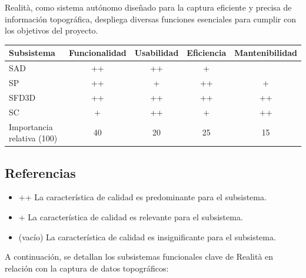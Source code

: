 \documentclass[12pt,a4paper, twoside]{article} %
\begin{document}
Realità, como sistema autónomo diseñado para la captura eficiente y precisa de información topográfica, despliega diversas funciones esenciales para cumplir con los objetivos del proyecto. 


\begin{table}[h]
\centering
\begin{tabular}{|l|c|c|c|c|}
    \hline
    Subsistema & Funcionalidad  & Usabilidad & Eficiencia & Mantenibilidad \\
    \hline
    SAD & ++ & ++ & + &  \\
    SP & ++ & + & ++ & + \\
    SFD3D & ++ & ++ & ++ & ++ \\
    SC & + & ++ & + & ++\\
    \hline
    Importancia relativa (100) & 40 & 20 & 25 & 15\\
    \hline
\end{tabular}
\end{table}

\subsection*{Referencias}

\begin{itemize}
    \item ++ La característica de calidad es predominante para el subsistema.
    \item + La característica de calidad es relevante para el subsistema.
    \item (vacío) La característica de calidad es insignificante para el subsistema.
\end{itemize}


A continuación, se detallan los subsistemas funcionales clave de Realità en relación con la captura de datos topográficos:
\end{document}
